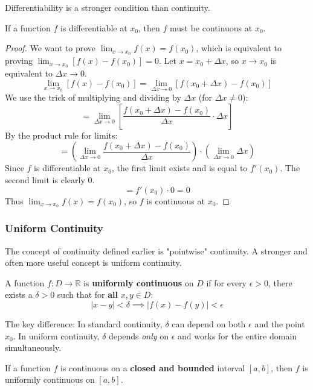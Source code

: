 \documentclass[oneside]{book}
\begin{document}
Differentiability is a stronger condition than continuity.

\begin{theorem}
If a function $f$ is differentiable at $x_0$, then $f$ must be continuous at $x_0$.
\end{theorem}

\begin{proof}
We want to prove $\lim_{x \to x_0} f(x) = f(x_0)$, which is equivalent to proving $\lim_{x \to x_0} [f(x) - f(x_0)] = 0$.
Let $x = x_0 + \Delta x$, so $x \to x_0$ is equivalent to $\Delta x \to 0$.
\[
\lim_{x \to x_0} [f(x) - f(x_0)] = \lim_{\Delta x \to 0} [f(x_0 + \Delta x) - f(x_0)]
\]
We use the trick of multiplying and dividing by $\Delta x$ (for $\Delta x \neq 0$):
\[
= \lim_{\Delta x \to 0} \left[ \frac{f(x_0 + \Delta x) - f(x_0)}{\Delta x} \cdot \Delta x \right]
\]
By the product rule for limits:
\[
= \left( \lim_{\Delta x \to 0} \frac{f(x_0 + \Delta x) - f(x_0)}{\Delta x} \right) \cdot \left( \lim_{\Delta x \to 0} \Delta x \right)
\]
Since $f$ is differentiable at $x_0$, the first limit exists and is equal to $f'(x_0)$. The second limit is clearly $0$.
\[
= f'(x_0) \cdot 0 = 0
\]
Thus $\lim_{x \to x_0} f(x) = f(x_0)$, so $f$ is continuous at $x_0$.
\end{proof}
\subsubsection{Uniform Continuity}
The concept of continuity defined earlier is "pointwise" continuity. A stronger and often more useful concept is uniform continuity.

\begin{definition}
A function $f: D \to \mathbb{R}$ is \textbf{uniformly continuous} on $D$ if for every $\epsilon > 0$, there exists a $\delta > 0$ such that for \textbf{all} $x, y \in D$:
\[ |x - y| < \delta \implies |f(x) - f(y)| < \epsilon \]
\end{definition}

The key difference: In standard continuity, $\delta$ can depend on both $\epsilon$ and the point $x_0$. In uniform continuity, $\delta$ depends \emph{only} on $\epsilon$ and works for the entire domain simultaneously.

\begin{theorem}
If a function $f$ is continuous on a \textbf{closed and bounded} interval $[a, b]$, then $f$ is uniformly continuous on $[a, b]$.
\end{theorem}
\end{document}

